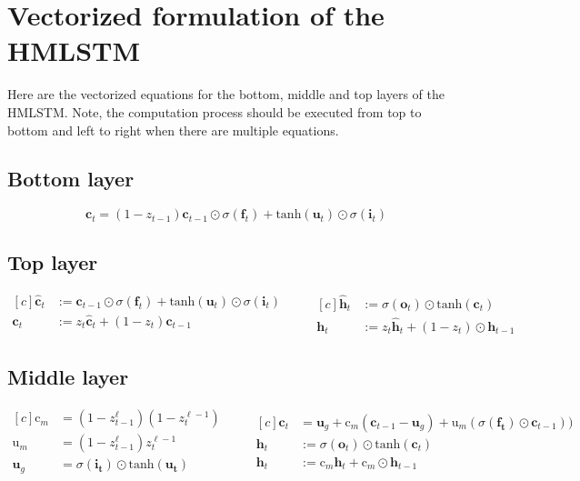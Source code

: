 \appendix
\section{Vectorized formulation of the HMLSTM}
\label{sect:appendix:vectorized_HMLSTM}

Here are the vectorized equations for the bottom, middle and top layers of the HMLSTM. Note, the computation process should be executed from top to bottom and left to right when there are multiple equations.

\subsection*{Bottom layer}
\begin{equation}
   \mathbf{c}_t = (1 - z_{t-1}) \mathbf{c}_{t-1} \odot \sigma (\mathbf{f}_t) + \text{tanh}(\mathbf{u}_t) \odot \sigma (\mathbf{i}_t) 
\end{equation}

\subsection*{Top layer}
\begin{equation}
\begin{aligned}[c]
\mathbf{\hat{c}}_t &:= \mathbf{c}_{t-1} \odot \sigma (\mathbf{f}_t) + \text{tanh}(\mathbf{u}_t) \odot \sigma (\mathbf{i}_t) \\
 \mathbf{c}_t &:= z_{t} \mathbf{\hat{c}}_t + (1 - z_t)  \mathbf{c}_{t-1}  \\
\end{aligned}
\qquad
\begin{aligned}[c]
\mathbf{\hat{h}}_t &:= \sigma (\mathbf{o}_t) \odot \text{tanh}(\mathbf{c}_t) \\
\mathbf{h}_t &:= z_{t} \mathbf{\hat{h}}_t + (1 - z_t) \odot \mathbf{h}_{t-1}
\end{aligned}
\end{equation}

\subsection*{Middle layer}
\begin{equation}
\begin{aligned}[c]
\mathrm{c}_m &= (1 - z^\ell_{t-1})   (1 - z^{\ell-1}_t) \\
\mathrm{u}_m &= (1 - z^\ell_{t-1})   z^{\ell-1}_t \\
\mathbf{u}_g &= \sigma(\mathbf{i_t}) \odot \mathrm{tanh}(\mathbf{u_t})
\end{aligned}
\qquad
\begin{aligned}[c]
\mathbf{c}_t &= \mathbf{u}_g + \mathrm{c}_m(\mathbf{c}_{t-1} - \mathbf{u}_g) + \mathrm{u}_m (\sigma(\mathbf{f_t}) \odot \mathbf{c}_{t-1}  ) ) \\
 \mathbf{h}_t &:= \sigma (\mathbf{o}_t) \odot \mathrm{tanh}(\mathbf{c}_t) \\
\mathbf{h}_t &:= \mathrm{c}_m  \mathbf{h}_t + \mathrm{c}_m \odot \mathbf{h}_{t-1}
\end{aligned}
\end{equation}
